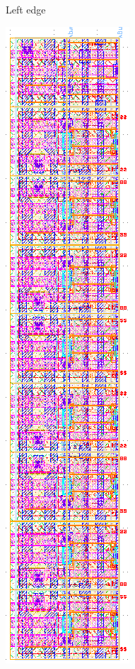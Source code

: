 \begin{figure}[H]
\begin{subfigure}[b]{0.22\textwidth}
\caption{Left edge}
\end{subfigure}
\hfill
\begin{subfigure}[b]{0.22\textwidth} \centering
\includegraphics[width=\textwidth]{figures/bitcell_left.png}

\end{subfigure}
\end{figure}
